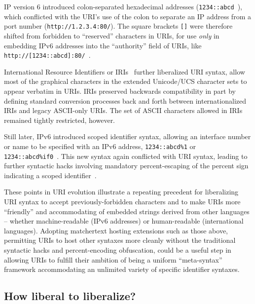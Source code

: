 IP version 6 introduced colon-separated hexadecimal addresses
(\eg \verb|1234::abcd|~\cite{rfc2373}),
which conflicted with the URI's use of the colon to separate
an IP address from a port number (\eg \verb|http://1.2.3.4:80/|).
The square brackets \verb|[]| were therefore shifted
from forbidden to ``reserved'' characters in URIs,
for use \emph{only} in embedding IPv6 addresses
into the ``authority'' field of URIs,
like \verb|http://[1234::abcd]:80/|~\cite{rfc2732}.

International Resource Identifiers or IRIs~\cite{rfc3987}
further liberalized URI syntax,
allow most of the graphical characters
in the extended Unicode/UCS character sets to appear verbatim in URIs.
IRIs preserved backwards compatibility
in part by defining standard conversion processes back and forth
between internationalized IRIs and legacy ASCII-only URIs.
The set of ASCII characters allowed in IRIs remained tightly restricted,
however.

Still later, IPv6 introduced scoped identifier syntax,
allowing an interface number or name to be specified with an IPv6 address,
\eg \verb|1234::abcd%1| or \verb|1234::abcd%if0|~\cite{rfc4007}.
This new syntax again conflicted with URI syntax,
leading to further syntactic hacks involving
mandatory percent-escaping of the percent sign
indicating a scoped identifier~\cite{rfc6874}.

These points in URI evolution illustrate
a repeating precedent for liberalizing URI syntax
to accept previously-forbidden characters
and to make URIs more ``friendly'' and accommodating
of embedded strings derived from other languages --
whether machine-readable (\eg IPv6 addresses)
or human-readable (international languages).
Adopting matchertext hosting extensions such as those above,
permitting URIs to host other syntaxes more cleanly
without the traditional  syntactic hacks and percent-encoding obfuscation,
could be a useful step in allowing URIs to fulfill their ambition
of being a uniform ``meta-syntax'' framework
accommodating an unlimited variety of specific identifier syntaxes.



\subsection{How liberal to liberalize?}
\label{app:uri:liberal}

